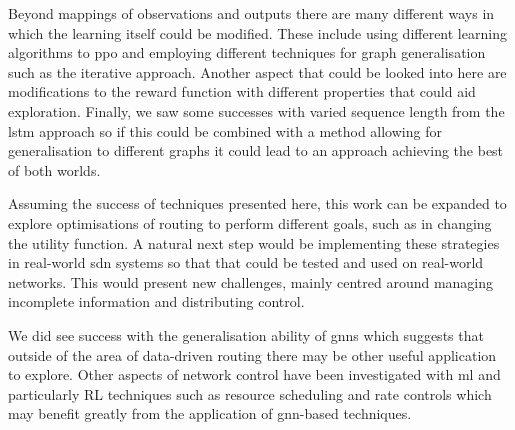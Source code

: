 Beyond mappings of observations and outputs there are many different ways in which the learning itself could be modified. These include using different learning algorithms to \ac{ppo} and employing different techniques for graph generalisation such as the iterative approach. Another aspect that could be looked into here are modifications to the reward function with different properties that could aid exploration. Finally, we saw some successes with varied sequence length from the \ac{lstm} approach so if this could be combined with a method allowing for generalisation to different graphs it could lead to an approach achieving the best of both worlds.

Assuming the success of techniques presented here, this work can be expanded to explore optimisations of routing to perform different goals, such as in changing the utility function. A natural next step would be implementing these strategies in real-world \ac{sdn} systems so that that could be tested and used on real-world networks. This would present new challenges, mainly centred around managing incomplete information and distributing control.

We did see success with the generalisation ability of \acp{gnn} which suggests that outside of the area of data-driven routing there may be other useful application to explore. Other aspects of network control have been investigated with \ac{ml} and particularly RL techniques such as resource scheduling and rate controls which may benefit greatly from the application of \ac{gnn}-based techniques.

